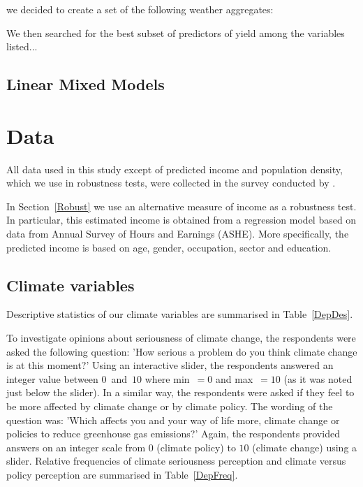 \documentclass[a4paper,12pt]{article}
\begin{document}
 we decided to create a set of the following weather aggregates:

We then searched for the best subset of predictors of yield among the variables listed... 


\subsection{Linear Mixed Models}

\sloppy





\FloatBarrier
\section{Data}\label{Data}
All data used in this study except of predicted income and population density, which we use in robustness tests,  were collected in the survey conducted by \cite{SurveyUK}. 



In Section~\ref{Robust} we use an alternative measure of income as a robustness test. In particular, this estimated income is obtained from a regression model based on data from Annual Survey of Hours and Earnings (ASHE). More specifically, the predicted income is based on age, gender, occupation, sector and education.









\subsection{Climate variables}\label{ClimateVars}


Descriptive statistics of our climate variables are summarised in Table~\ref{DepDes}.



To investigate opinions about seriousness of climate change, the respondents were asked the following question: 'How serious a problem do you think climate change is at this moment?' Using an interactive slider, the respondents answered an integer value between $0$~and~$10$ where min~$=0$ and max~$=10$ (as it was noted just below the slider). In a similar way, the respondents were asked if they feel to be more affected by climate change or by climate policy. The wording of the question was: 'Which affects you and your way of life more, climate change or policies to reduce greenhouse gas emissions?' Again, the respondents provided answers on an integer scale from $0$ (climate policy) to $10$ (climate change) using a slider. Relative frequencies of climate seriousness perception and climate versus policy perception are summarised in Table~\ref{DepFreq}.
\end{document}
